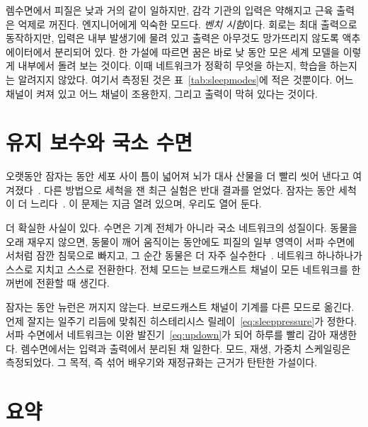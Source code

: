 렘수면에서 피질은 낮과 거의 같이 일하지만, 감각 기관의 입력은 약해지고 근육 출력은 억제로 꺼진다. 엔지니어에게 익숙한 모드다. \emph{벤치 시험}이다. 회로는 최대 출력으로 동작하지만, 입력은 내부 발생기에 물려 있고 출력은 아무것도 망가뜨리지 않도록 액추에이터에서 분리되어 있다. 한 가설에 따르면 꿈은 바로 낮 동안 모은 세계 모델을 이렇게 내부에서 돌려 보는 것이다. 이때 네트워크가 정확히 무엇을 하는지, 학습을 하는지는 알려지지 않았다. 여기서 측정된 것은 표~\ref{tab:sleepmodes}에 적은 것뿐이다. 어느 채널이 켜져 있고 어느 채널이 조용한지, 그리고 출력이 막혀 있다는 것이다.

\section{유지 보수와 국소 수면}

오랫동안 잠자는 동안 세포 사이 틈이 넓어져 뇌가 대사 산물을 더 빨리 씻어 낸다고 여겨졌다~\cite{Xie2013}. 다른 방법으로 세척을 잰 최근 실험은 반대 결과를 얻었다. 잠자는 동안 세척이 더 느리다~\cite{Miao2024}. 이 문제는 지금 열려 있으며, 우리도 열어 둔다.

더 확실한 사실이 있다. 수면은 기계 전체가 아니라 국소 네트워크의 성질이다. 동물을 오래 재우지 않으면, 동물이 깨어 움직이는 동안에도 피질의 일부 영역이 서파 수면에서처럼 잠깐 침묵으로 빠지고, 그 순간 동물은 더 자주 실수한다~\cite{Vyazovskiy2011}. 네트워크 하나하나가 스스로 지치고 스스로 전환한다. 전체 모드는 브로드캐스트 채널이 모든 네트워크를 한꺼번에 전환할 때 생긴다.

\begin{keyblock}
\begin{proposition}[모드 묶음으로서의 수면]
\label{prop:sleep}
잠자는 동안 뉴런은 꺼지지 않는다. 브로드캐스트 채널이 기계를 다른 모드로 옮긴다. 언제 잘지는 일주기 리듬에 맞춰진 히스테리시스 릴레이~\eqref{eq:sleeppressure}가 정한다. 서파 수면에서 네트워크는 이완 발진기~\eqref{eq:updown}가 되어 하루를 빨리 감아 재생한다. 렘수면에서는 입력과 출력에서 분리된 채 일한다. 모드, 재생, 가중치 스케일링은 측정되었다. 그 목적, 즉 섞어 배우기와 재정규화는 근거가 탄탄한 가설이다.
\end{proposition}
\end{keyblock}

\section{요약}

